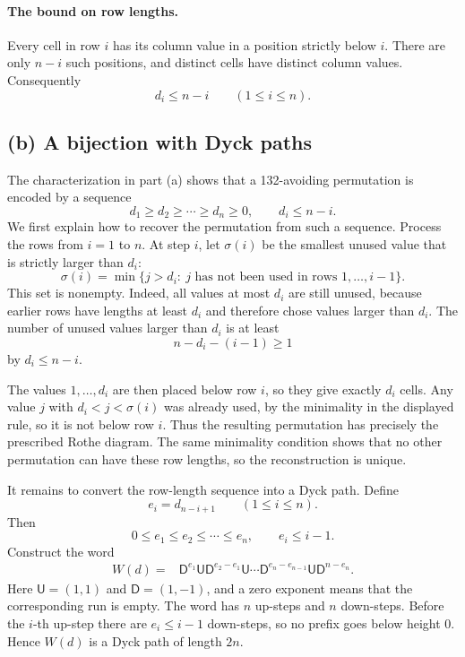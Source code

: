 \documentclass[11pt]{article}
\newcommand{\U}{\mathsf{U}}
\newcommand{\D}{\mathsf{D}}
\begin{document}
\paragraph{The bound on row lengths.}
Every cell in row \(i\) has its column value in a position strictly below
\(i\). There are only \(n-i\) such positions, and distinct cells have
distinct column values. Consequently
\[
\boxed{d_i\leq n-i\qquad(1\leq i\leq n).}
\]

\subsection*{(b) A bijection with Dyck paths}

The characterization in part (a) shows that a 132-avoiding permutation is
encoded by a sequence
\[
    d_1\geq d_2\geq\cdots\geq d_n\geq0,
    \qquad d_i\leq n-i.
\]
We first explain how to recover the permutation from such a sequence. Process
the rows from \(i=1\) to \(n\). At step \(i\), let \(\sigma(i)\) be the
smallest unused value that is strictly larger than \(d_i\):
\[
\boxed{\sigma(i)=\min\{j>d_i:\ j\text{ has not been used in rows }1,\ldots,i-1\}.}
\]
This set is nonempty. Indeed, all values at most \(d_i\) are still unused,
because earlier rows have lengths at least \(d_i\) and therefore chose values
larger than \(d_i\). The number of unused values larger than \(d_i\) is at
least
\[
    n-d_i-(i-1)\geq1
\]
by \(d_i\leq n-i\).

The values \(1,\ldots,d_i\) are then placed below row \(i\), so they give
exactly \(d_i\) cells. Any value \(j\) with \(d_i<j<\sigma(i)\) was already
used, by the minimality in the displayed rule, so it is not below row \(i\).
Thus the resulting permutation has precisely the prescribed Rothe diagram.
The same minimality condition shows that no other permutation can have these
row lengths, so the reconstruction is unique.

It remains to convert the row-length sequence into a Dyck path. Define
\[
    e_i=d_{n-i+1}\qquad(1\leq i\leq n).
\]
Then
\[
    0\leq e_1\leq e_2\leq\cdots\leq e_n,
    \qquad e_i\leq i-1.
\]
Construct the word
\[
\begin{aligned}
W(d)={}&
\D^{e_1}\U
\D^{e_2-e_1}\U
\cdots
\D^{e_n-e_{n-1}}\U
\D^{n-e_n}.
\end{aligned}
\]
Here \(\U=(1,1)\) and \(\D=(1,-1)\), and a zero exponent means that the
corresponding run is empty. The word has \(n\) up-steps and \(n\) down-steps.
Before the \(i\)-th up-step there are \(e_i\leq i-1\) down-steps, so no
prefix goes below height \(0\). Hence \(W(d)\) is a Dyck path of length
\(2n\).
\end{document}
